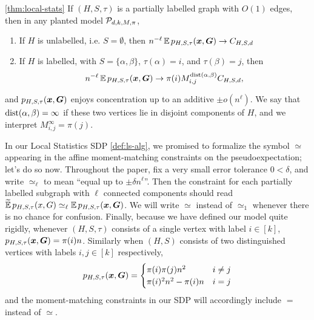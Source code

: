 \begin{theorem} \ref{thm:local-stats}
    If $(H,S,\tau)$ is a partially labelled graph with $O(1)$ edges, then in any planted model $\mathcal{P}_{d,k,M,\pi}$,
    \begin{enumerate}
        \item If $H$ is unlabelled, i.e. $S = \emptyset$, then $n^{-\ell} \operatorname*{\mathbb{E}} p_{H,S,\tau}({\boldsymbol{x}},\boldsymbol{G}) \to C_{H,S,d}$
        \item If $H$ is labelled, with $S = \{\alpha,\beta\}$, $\tau(\alpha) = i$, and $\tau(\beta) = j$, then
        $$
            n^{-\ell} \operatorname*{\mathbb{E}} p_{H,S,\tau}({\boldsymbol{x}},\boldsymbol{G}) \to \pi(i) M_{i,j}^{\operatorname{dist}(\alpha,\beta)} C_{H,S,d},
        $$
    \end{enumerate}
    and $p_{H,S,\tau}({\boldsymbol{x}},\boldsymbol{G})$ enjoys concentration up to an additive $\pm o(n^\ell)$. We say that $\operatorname{dist}(\alpha,\beta) = \infty$ if these two vertices lie in disjoint components of $H$, and we interpret $M_{i,j}^\infty = \pi(j)$.
\end{theorem}

\begin{remark} \label{rem:ls-approx-def}
    In our Local Statistics SDP \ref{def:ls-alg}, we promised to formalize the symbol $\simeq$ appearing in the affine moment-matching constraints on the pseudoexpectation; let's do so now. Throughout the paper, fix a very small error tolerance $0 < \delta$, and write $\simeq_\ell$ to mean ``equal up to $\pm \delta n^\ell$''. Then the constraint for each partially labelled subgraph with $\ell$ connected components should read $\widetilde{\operatorname*{\mathbb{E}}}\, p_{H,S,\tau}(x,G) \simeq_\ell \operatorname*{\mathbb{E}} p_{H,S,\tau}({\boldsymbol{x}},\boldsymbol{G})$. We will write $\simeq$ instead of $\simeq_1$ whenever there is no chance for confusion. Finally, because we have defined our model quite rigidly, whenever $(H,S,\tau)$ consists of a single vertex with label $i\in [k]$, $p_{H,S,\tau}({\boldsymbol{x}},\boldsymbol{G}) = \pi(i)n$. Similarly when $(H,S)$ consists of two distinguished vertices with labels $i,j\in[k]$ respectively, $$
        p_{H,S,\tau}({\boldsymbol{x}},\boldsymbol{G}) = \begin{cases} \pi(i)\pi(j)n^2 &i\neq j \\
        \pi(i)^2n^2 - \pi(i)n &i=j \end{cases}
    $$
    and the moment-matching constraints in our SDP will accordingly include $=$ instead of $\simeq$.
\end{remark}

